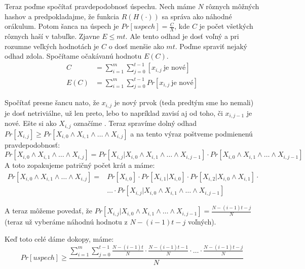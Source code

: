 Teraz poďme spočítať pravdepodobnosť úspechu.
Nech máme $N$ rôznych môžných hashov a predpokladajme, že
funkcia $R(H(\cdot))$ sa správa ako náhodné orákulum.
Potom šanca na úspech je $Pr[uspech] = \frac{C}{X}$,
kde $C$ je počet všetkých rôznych haší v tabuľke.
Zjavne $E \leq mt$.
Ale tento odhad je dosť voľný a pri rozumne veľkých hodnotách je $C$ 
o dosť menšie ako $mt$. 
Poďme spraviť nejaký odhad zdola.
Spočítame očakávanú hodnotu $E(C)$.
\begin{align*}
    C &= \sum_{i=1}^m \sum_{j=0}^{t-1} [x_{i,j} ~\text{je nové}] \\
    E(C) &=\sum_{i=1}^m \sum_{j=0}^{t-1} Pr[x_{i,j} ~\text{je nové}] 
\end{align*}

Spočítať presne šancu nato, že $x_{i,j}$ je nový prvok 
(teda predtým sme ho nemali) je dosť netriviálne,
už len preto, lebo to napríklad zavisí aj od toho, či $x_{i,j-1}$ je nové.
Ešte si ako $X_{i,j}$ označíme .
Teraz spravíme dolný odhad 
$Pr[X_{i,j}] \geq Pr[X_{i,0}\land X_{i,1} \land \dots \land X_{i,j}]$
a na tento výraz poštveme podmienenú pravdepodobnosť:
\begin{equation*}
    Pr[X_{i,0} \land X_{i,1} \land \dots \land X_{i,j}] = 
    Pr[X_{i,j} | X_{i,0} \land X_{i,1} \land \dots \land X_{i,j-1} ]
    \cdot
    Pr[X_{i,0} \land X_{i,1} \land \dots \land X_{i,j-1} ]
\end{equation*}
A toto zopakujeme patričný počet krát a máme:
\begin{equation*}
\begin{split}
    Pr[X_{i,0} \land X_{i,1} \land \dots \land X_{i,j}] =&    
    Pr[X_{i,0}] \cdot Pr[X_{i,1} | X_{i,0}] \cdot 
        Pr[X_{i,2} | X_{i,0} \land X_{i,1}] \cdot \\ 
        & \ldots \cdot
        Pr[X_{i,j} | X_{i,0} \land X_{i,1} \land \dots \land X_{i,j-1}]
\end{split}    
\end{equation*}

A teraz môžeme povedať, že
$Pr[X_{i,j} | X_{i,0} \land X_{i,1} \land \dots \land X_{i,j-1}] =
    \frac{N - (i-1)t - j}{N}$
(teraz už vyberáme náhodnú hodnotu z $N - (i-1)t - j$ voľných). 

Keď toto celé dáme dokopy, máme:
\begin{equation*}
    Pr[uspech] \geq \frac{\displaystyle
        \sum_{i=1}^m \sum_{j=0}^{t-1}
            \frac{N - (i-1)t}{N} \cdot \frac{N - (i-1)t - 1}{N} \cdot \dots
            \cdot \frac{N - (i-1)t - j}{N}
        }{N}
\end{equation*}

